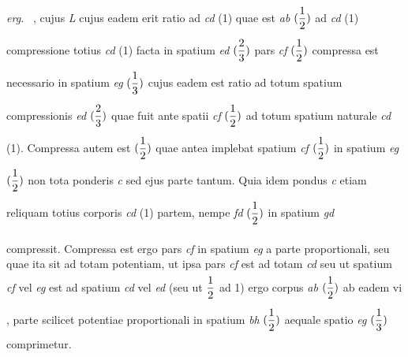 {{                    \textit{ erg.} \textbar\ , cujus \textit{ L}}} cujus eadem erit ratio ad \textit{cd} (1) quae est \textit{ab} $\rule[-4mm]{0mm}{10mm}(\displaystyle\frac{1}{2})$ ad \textit{cd} (1) compressione\protect{} totius \textit{cd} (1) facta in spatium \textit{ed} $\rule[-4mm]{0mm}{10mm}(\displaystyle\frac{2}{3})$ pars \textit{cf} $\rule[-4mm]{0mm}{10mm}(\displaystyle\frac{1}{2})$ compressa est necessario in spatium \textit{eg} $\rule[-4mm]{0mm}{10mm}(\displaystyle\frac{1}{3})$ cujus eadem est ratio ad totum spatium compressionis\protect{} \textit{ed} $\rule[-4mm]{0mm}{10mm}(\displaystyle\frac{2}{3})$ quae fuit ante spatii \textit{cf} $\rule[-4mm]{0mm}{10mm}(\displaystyle\frac{1}{2})$ ad totum spatium naturale \textit{cd} (1). Compressa autem est  $\rule[-4mm]{0mm}{10mm}(\displaystyle\frac{1}{2})$ quae antea implebat spatium \textit{cf} $\rule[-4mm]{0mm}{10mm}(\displaystyle\frac{1}{2})$  in spatium \textit{eg} $\rule[-4mm]{0mm}{10mm}(\displaystyle\frac{1}{2})$ non tota  ponderis \textit{c}  sed ejus parte tantum. Quia idem pondus\protect{} \textit{c}  etiam reliquam totius corporis \textit{cd} (1) partem, nempe \textit{fd} $\rule[-4mm]{0mm}{10mm}(\displaystyle\frac{1}{2})$ in spatium \textit{gd} \rule[-4mm]{0mm}{10mm} compressit. Compressa est ergo pars \textit{cf} in spatium \textit{eg} a parte  proportionali, seu quae ita sit ad totam potentiam, ut ipsa pars \textit{cf} est ad totam \textit{cd} seu ut spatium \textit{cf} vel \textit{eg} est ad spatium \textit{cd} vel \textit{ed} (seu ut $\rule[-4mm]{0mm}{10mm}\displaystyle\frac{1}{2}$  ad 1) ergo corpus \textit{ab} $\rule[-4mm]{0mm}{10mm}(\displaystyle\frac{1}{2})$ ab eadem vi , parte scilicet potentiae proportionali in spatium \textit{bh} $\rule[-4mm]{0mm}{10mm}(\displaystyle\frac{1}{2})$ aequale spatio \textit{eg} $\rule[-4mm]{0mm}{10mm}(\displaystyle\frac{1}{3})$ comprimetur. %
